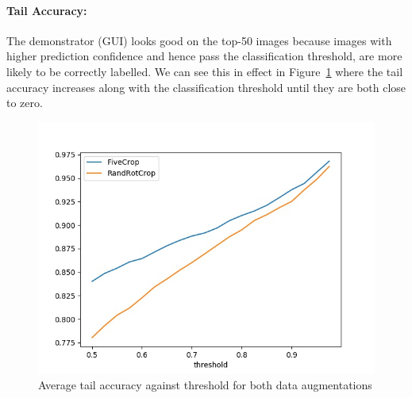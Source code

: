 \documentclass{article}
\begin{document}
\paragraph{Tail Accuracy:}
The demonstrator (GUI) looks good on the top-50 images because images with higher prediction confidence and hence pass the classification threshold, are more likely to be correctly labelled. We can see this in effect in Figure~\ref{fig:tailacc} where the tail accuracy increases along with the classification threshold until they are both close to zero.
\begin{figure}[H]
    \centering
    \includegraphics[width=.7\textwidth]{tail_acc.jpg}
    \caption{Average tail accuracy against threshold for both data augmentations}
    \label{fig:tailacc}
\end{figure}

\newpage
\end{document}
